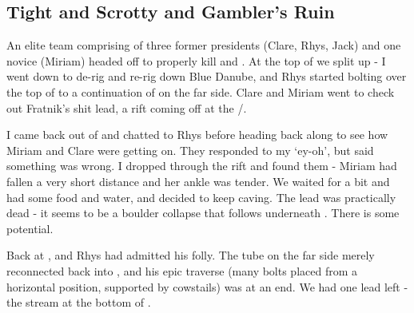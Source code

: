  

\subsection{Tight and Scrotty and Gambler’s Ruin}

An elite team comprising of three former presidents (Clare, Rhys, Jack) and one novice (Miriam) headed off to properly kill  and . At the top of  we split up - I went down  to de-rig and re-rig down Blue Danube, and Rhys started bolting over the top of  to a continuation of  on the far side. Clare and Miriam went to check out Fratnik’s shit lead, a rift coming off at the /.

\begin{marginfigure}
\end{marginfigure}

I came back out of  and chatted to Rhys before heading back along  to see how Miriam and Clare were getting on. They responded to my ‘ey-oh’, but said something was wrong. I dropped through the rift and found them - Miriam had fallen a very short distance and her ankle was tender. We waited for a bit and had some food and water, and decided to keep caving. The lead was practically dead - it seems to be a boulder collapse that follows underneath . There is some potential.
 
Back at , and Rhys had admitted his folly. The tube on the far side merely reconnected back into , and his epic traverse (many bolts placed from a horizontal position, supported by cowstails) was at an end. We had one lead left - the stream at the bottom of .
 
